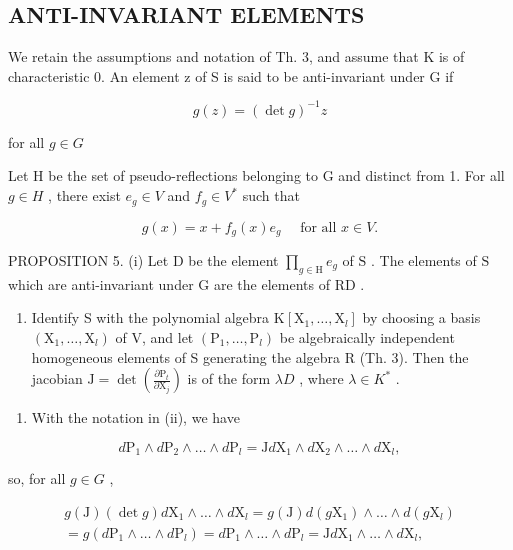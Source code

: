 \subsection{ANTI-INVARIANT ELEMENTS}

We retain the assumptions and notation of Th. 3, and assume that K is of characteristic 0. An element z of S is said to be anti-invariant under G if

\[
g (z) = (\det g) ^ {- 1} z
\]

for all \(g\in G\)

Let H be the set of pseudo-reflections belonging to G and distinct from 1. For all \(g \in H\) , there exist \(e_{g} \in V\) and \(f_{g} \in V^{*}\) such that

\[
g (x) = x + f _ {g} (x) e _ {g} \quad \text {   for   all   } x \in V.
\]

PROPOSITION 5. (i) Let \(\mathrm{D}\) be the element \(\prod_{g \in \mathrm{H}} e_g\) of \(\mathrm{S}\) . The elements of \(\mathrm{S}\) which are anti-invariant under \(\mathrm{G}\) are the elements of \(\mathrm{RD}\) .

\begin{enumerate}
\def\labelenumi{(\roman{enumi})}
\setcounter{enumi}{1}
\tightlist
\item
  Identify S with the polynomial algebra \(\mathrm{K}[\mathrm{X}_1,\dots ,\mathrm{X}_l]\) by choosing a basis \((\mathrm{X}_1,\dots ,\mathrm{X}_l)\) of V, and let \((\mathrm{P}_1,\dots ,\mathrm{P}_l)\) be algebraically independent homogeneous elements of S generating the algebra R (Th. 3). Then the jacobian \(\mathrm{J} = \det \left(\frac{\partial\mathrm{P}_t}{\partial\mathrm{X}_j}\right)\) is of the form \(\lambda D\) , where \(\lambda \in K^*\) .
\end{enumerate}

\begin{enumerate}
\def\labelenumi{\alph{enumi})}
\tightlist
\item
  With the notation in (ii), we have
\end{enumerate}

\[
d \mathrm{P} _ {1} \wedge d \mathrm{P} _ {2} \wedge \dots \wedge d \mathrm{P} _ {l} = \mathrm{J} d \mathrm{X} _ {1} \wedge d \mathrm{X} _ {2} \wedge \dots \wedge d \mathrm{X} _ {l},
\]

so, for all \(g \in G\) ,

\[
\begin{array}{c} g (\mathrm{J}) (\det g)   d \mathrm{X} _ {1} \wedge \ldots \wedge d \mathrm{X} _ {l} = g (\mathrm{J})   d (g \mathrm{X} _ {1}) \wedge \ldots \wedge d (g \mathrm{X} _ {l}) \\ = g (d \mathrm{P} _ {1} \wedge \ldots \wedge d \mathrm{P} _ {l}) = d \mathrm{P} _ {1} \wedge \ldots \wedge d \mathrm{P} _ {l} = \mathrm{J}   d \mathrm{X} _ {1} \wedge \ldots \wedge d \mathrm{X} _ {l}, \end{array}
\]

